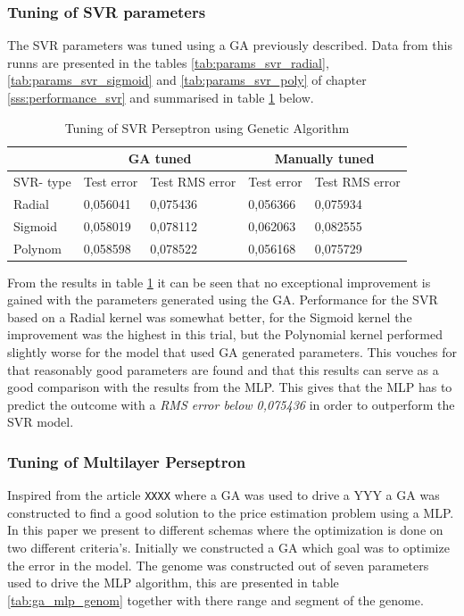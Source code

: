 \subsubsection{Tuning of SVR parameters} \label{sss:ga_tuning_svr}
The SVR parameters was tuned using a GA previously described. Data from this runns are presented in the tables \ref{tab:params_svr_radial}, \ref{tab:params_svr_sigmoid} and \ref{tab:params_svr_poly} of chapter \ref{sss:performance_svr} and summarised in table \ref{tab:ga_svr_tuning} below.  
\begin{table}[H]
\begin{tabular}{ | l | l | l | l | l |  }
\hline
\multicolumn{1}{|c|}{} & \multicolumn{2}{|c|}{GA tuned} & \multicolumn{2}{|c|}{Manually tuned} \\
\hline
SVR- type & Test error & Test RMS error & Test error & Test RMS error \\
\hline
\hline
Radial & 0,056041 & 0,075436 & 0,056366 & 0,075934 \\
Sigmoid & 0,058019 & 0,078112 & 0,062063 & 0,082555 \\
Polynom & 0,058598 & 0,078522 & 0,056168 & 0,075729 \\
\hline
\end{tabular}
\caption{Tuning of SVR Perseptron using Genetic Algorithm}
\label{tab:ga_svr_tuning}
\end{table}
From the results in table \ref{tab:ga_svr_tuning} it can be seen that no exceptional improvement is gained with the parameters generated using the GA. Performance for the SVR based on a Radial kernel was somewhat better, for the Sigmoid kernel the improvement was the highest in this trial, but the Polynomial kernel performed slightly worse for the model that used GA generated parameters. This vouches for that reasonably good parameters are found and that this results can serve as a good comparison with the results from the MLP. This gives that the MLP has to predict the outcome with a \emph{RMS error below 0,075436} in order to outperform the SVR model. 


\subsubsection{Tuning of Multilayer Perseptron} \label{sss:ga_tuning_mlp}
Inspired from the article \texttt{XXXX} where a GA was used to drive a YYY a GA was constructed to find a good solution to the price estimation problem using a MLP. In this paper we present to different schemas where the optimization is done on two different criteria's. Initially we constructed a GA which goal was to optimize the error in the model. The genome was constructed out of seven parameters used to drive the MLP algorithm, this are presented in table \ref{tab:ga_mlp_genom} together with there range and segment of the genome. 

